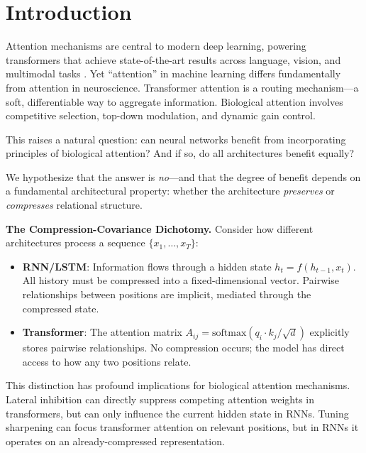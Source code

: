 \section{Introduction}

Attention mechanisms are central to modern deep learning, powering transformers that achieve state-of-the-art results across language, vision, and multimodal tasks \cite{vaswani2017attention}. Yet ``attention'' in machine learning differs fundamentally from attention in neuroscience. Transformer attention is a routing mechanism---a soft, differentiable way to aggregate information. Biological attention involves competitive selection, top-down modulation, and dynamic gain control.

This raises a natural question: can neural networks benefit from incorporating principles of biological attention? And if so, do all architectures benefit equally?

We hypothesize that the answer is \textit{no}---and that the degree of benefit depends on a fundamental architectural property: whether the architecture \textit{preserves} or \textit{compresses} relational structure.

\textbf{The Compression-Covariance Dichotomy.} Consider how different architectures process a sequence $\{x_1, \ldots, x_T\}$:
\begin{itemize}
\item \textbf{RNN/LSTM}: Information flows through a hidden state $h_t = f(h_{t-1}, x_t)$. All history must be compressed into a fixed-dimensional vector. Pairwise relationships between positions are implicit, mediated through the compressed state.
\item \textbf{Transformer}: The attention matrix $A_{ij} = \text{softmax}(q_i \cdot k_j / \sqrt{d})$ explicitly stores pairwise relationships. No compression occurs; the model has direct access to how any two positions relate.
\end{itemize}

This distinction has profound implications for biological attention mechanisms. Lateral inhibition can directly suppress competing attention weights in transformers, but can only influence the current hidden state in RNNs. Tuning sharpening can focus transformer attention on relevant positions, but in RNNs it operates on an already-compressed representation.


